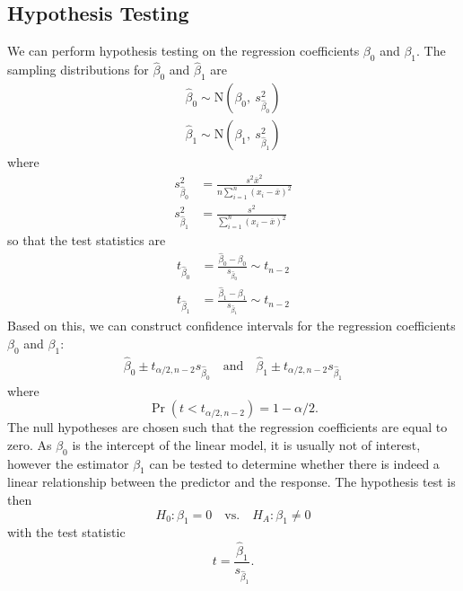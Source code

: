 \documentclass{article}
\begin{document}
\subsection{Hypothesis Testing}
We can perform hypothesis testing on the regression coefficients \(\beta_0\) and \(\beta_1\).
The sampling distributions for \(\hat{\beta}_0\) and \(\hat{\beta}_1\) are
\begin{align*}
    \hat{\beta}_0 \sim \mathrm{N}\left( \beta_0,\: s^2_{\hat{\beta}_0} \right) \\
    \hat{\beta}_1 \sim \mathrm{N}\left( \beta_1,\: s^2_{\hat{\beta}_1} \right)
\end{align*}
where
\begin{align*}
    s^2_{\hat{\beta}_0} & = \frac{s^2 \overline{x}^2}{n \sum_{i = 1}^n \left( x_i - \overline{x} \right)^2} \\
    s^2_{\hat{\beta}_1} & = \frac{s^2}{\sum_{i = 1}^n \left( x_i - \overline{x} \right)^2}
\end{align*}
so that the test statistics are
\begin{align*}
    t_{\hat{\beta}_0} & = \frac{\hat{\beta}_0 - \beta_0}{s_{\hat{\beta}_0}} \sim t_{n - 2} \\
    t_{\hat{\beta}_1} & = \frac{\hat{\beta}_1 - \beta_1}{s_{\hat{\beta}_1}} \sim t_{n - 2}
\end{align*}
Based on this, we can construct confidence intervals for the regression coefficients \(\beta_0\) and \(\beta_1\):
\begin{align*}
    \hat{\beta}_0 \pm t_{\alpha / 2, n - 2} s_{\hat{\beta}_0} \quad \text{and} \quad \hat{\beta}_1 \pm t_{\alpha / 2, n - 2} s_{\hat{\beta}_1}
\end{align*}
where
\begin{equation*}
    \Pr{\left( t < t_{\alpha / 2, n - 2} \right)} = 1 - \alpha / 2.
\end{equation*}
The null hypotheses are chosen such that the regression coefficients are equal to zero.
As \(\beta_0\) is the intercept of the linear model, it is usually not of interest, however the estimator \(\beta_1\)
can be tested to determine whether there is indeed a linear relationship between the predictor and the response.
The hypothesis test is then
\begin{equation*}
    H_0 : \beta_1 = 0 \quad \text{vs.} \quad H_A : \beta_1 \neq 0
\end{equation*}
with the test statistic
\begin{equation*}
    t = \frac{\hat{\beta}_1}{s_{\hat{\beta}_1}}.
\end{equation*}
\end{document}
